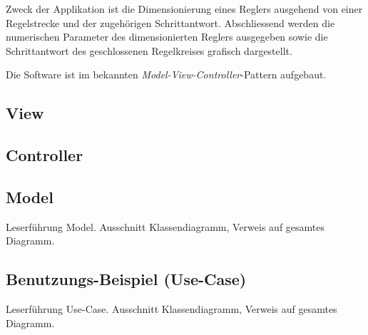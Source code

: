 
Zweck  der Applikation  ist die  Dimensionierung eines  Reglers ausgehend  von
einer Regelstrecke und  der zugeh\"origen Schrittantwort. Abschliessend werden
die  numerischen Parameter  des dimensionierten  Reglers ausgegeben  sowie die
Schrittantwort des geschlossenen Regelkreises grafisch dargestellt.

Die   Software    ist   im    bekannten   \emph{Model-View-Controller}-Pattern
aufgebaut.


\subsection{View}



\subsection{Controller}



\subsection{Model}

Leserf\"uhrung Model.
Ausschnitt Klassendiagramm, Verweis auf gesamtes Diagramm.




\subsection{Benutzungs-Beispiel (Use-Case)}

Leserf\"uhrung Use-Case.
Ausschnitt Klassendiagramm, Verweis auf gesamtes Diagramm.


